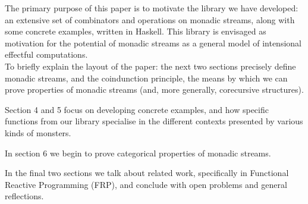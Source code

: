 The primary purpose of this paper is to motivate the library we have developed: an extensive set of combinators and operations on monadic streams, along with some concrete examples, written in Haskell. This library is envisaged as motivation for the potential of monadic streams as a general model of intensional effectful computations. \\

To briefly explain the layout of the paper: the next two sections precisely define monadic streams, and the coindunction principle, the means by which we can prove properties of monadic streams (and, more generally, corecursive structures).

Section 4 and 5 focus on developing concrete examples, and how specific functions from our library specialise in the different contexts presented by various kinds of monsters. 

In section 6 we begin to prove categorical properties of monadic streams. 

In the final two sections we talk about related work, specifically in Functional Reactive Programming (FRP), and conclude with open problems and general reflections.
